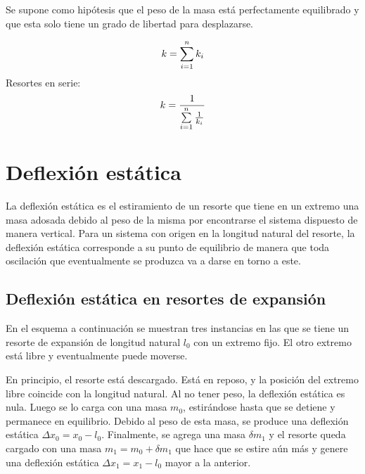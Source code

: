 \begin{center}
    \def\svgwidth{0.8\linewidth}
    
\end{center}

Se supone como hipótesis que el peso de la masa está perfectamente equilibrado y que esta solo tiene un grado de libertad para desplazarse.

\begin{mdframed}[style=DefinitionFrame]
    \begin{defn}
    \end{defn}
    \begin{equation*}
        k = \sum_{i=1}^n k_i
    \end{equation*}
    Resortes en serie:
    \begin{equation*}
        k = \frac{1}{\sum\limits_{i=1}^n \frac{1}{k_i}}
    \end{equation*}
\end{mdframed}


\section{Deflexión estática}

La deflexión estática es el estiramiento de un resorte que tiene en un extremo una masa adosada debido al peso de la misma por encontrarse el sistema dispuesto de manera vertical.
Para un sistema con origen en la longitud natural del resorte, la deflexión estática corresponde a su punto de equilibrio de manera que toda oscilación que eventualmente se produzca va a darse en torno a este.


\subsection*{Deflexión estática en resortes de expansión}

En el esquema a continuación se muestran tres instancias en las que se tiene un resorte de expansión de longitud natural $l_0$ con un extremo fijo.
El otro extremo está libre y eventualmente puede moverse.

\begin{center}
    \def\svgwidth{0.8\linewidth}
    
\end{center}

En principio, el resorte está descargado.
Está en reposo, y la posición del extremo libre coincide con la longitud natural.
Al no tener peso, la deflexión estática es nula.
Luego se lo carga con una masa $m_0$, estirándose hasta que se detiene y permanece en equilibrio.
Debido al peso de esta masa, se produce una deflexión estática $\Delta x_0=x_0-l_0$.
Finalmente, se agrega una masa $\delta m_1$ y el resorte queda cargado con una masa $m_1=m_0+\delta m_1$ que hace que se estire aún más y genere una deflexión estática $\Delta x_1=x_1-l_0$ mayor a la anterior.

